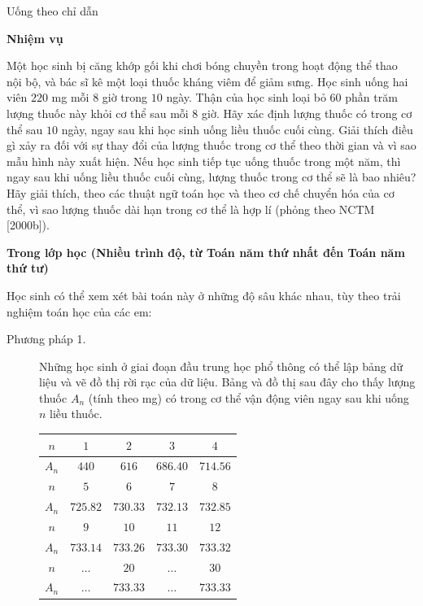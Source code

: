   {
    Uống theo chỉ dẫn
  }
  {
    \textbf{Nhiệm vụ}

    Một học sinh bị căng khớp gối khi chơi bóng chuyền trong hoạt động thể thao nội bộ, và bác sĩ kê một loại thuốc kháng viêm để giảm sưng. Học sinh uống hai viên $220$ mg mỗi $8$ giờ trong $10$ ngày. Thận của học sinh loại bỏ $60$ phần trăm lượng thuốc này khỏi cơ thể sau mỗi $8$ giờ. Hãy xác định lượng thuốc có trong cơ thể sau $10$ ngày, ngay sau khi học sinh uống liều thuốc cuối cùng. Giải thích điều gì xảy ra đối với sự thay đổi của lượng thuốc trong cơ thể theo thời gian và vì sao mẫu hình này xuất hiện. Nếu học sinh tiếp tục uống thuốc trong một năm, thì ngay sau khi uống liều thuốc cuối cùng, lượng thuốc trong cơ thể sẽ là bao nhiêu? Hãy giải thích, theo các thuật ngữ toán học và theo cơ chế chuyển hóa của cơ thể, vì sao lượng thuốc dài hạn trong cơ thể là hợp lí (phỏng theo NCTM [2000b]).\vspace{\baselineskip}

    \textbf{Trong lớp học (Nhiều trình độ, từ Toán năm thứ nhất đến Toán năm thứ tư)}

    Học sinh có thể xem xét bài toán này ở những độ sâu khác nhau, tùy theo trải nghiệm toán học của các em:

    \begin{description}
      \item[Phương pháp 1.] Những học sinh ở giai đoạn đầu trung học phổ thông có thể lập bảng dữ liệu và vẽ đồ thị rời rạc của dữ liệu. Bảng và đồ thị sau đây cho thấy lượng thuốc $A_n$ (tính theo mg) có trong cơ thể vận động viên ngay sau khi uống $n$ liều thuốc.\vspace{\baselineskip}

      \begin{center}
      \setlength{\tabcolsep}{5pt}
      \begin{tabular}{|c|c|c|c|c|}
      \hline
      $n$   & $1$      & $2$      & $3$      & $4$      \\
      \hline
      $A_n$ & $440$    & $616$    & $686.40$ & $714.56$ \\
      \hline
      $n$   & $5$      & $6$      & $7$      & $8$      \\
      \hline
      $A_n$ & $725.82$ & $730.33$ & $732.13$ & $732.85$ \\
      \hline
      $n$   & $9$      & $10$     & $11$     & $12$     \\
      \hline
      $A_n$ & $733.14$ & $733.26$ & $733.30$ & $733.32$ \\
      \hline
      $n$   & $\dots$  & $20$     & $\dots$  & $30$     \\
      \hline
      $A_n$ & $\dots$  & $733.33$ & $\dots$  & $733.33$ \\
      \hline
      \end{tabular}
      \end{center}


\end{description}}
